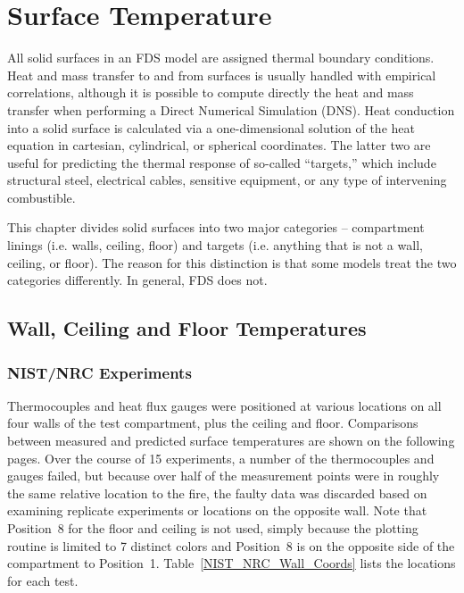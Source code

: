 
\chapter{Surface Temperature}

All solid surfaces in an FDS model are assigned thermal boundary conditions. Heat and mass transfer to and from surfaces is usually handled with empirical correlations, although it is possible to compute directly the heat and mass transfer when performing a Direct Numerical Simulation (DNS). Heat conduction into a solid surface is calculated via a one-dimensional solution of the heat equation in cartesian, cylindrical, or spherical coordinates. The latter two are useful for predicting the thermal response of so-called ``targets,'' which include structural steel, electrical cables, sensitive equipment, or any type of intervening combustible.

This chapter divides solid surfaces into two major categories -- compartment linings (i.e. walls, ceiling, floor) and targets (i.e. anything that is not a wall, ceiling, or floor). The reason for this distinction is that some models treat the two categories differently. In general, FDS does not.

\clearpage

\section{Wall, Ceiling and Floor Temperatures}


\subsection{NIST/NRC Experiments}

Thermocouples and heat flux gauges were positioned at various locations on all four walls of the test compartment, plus the ceiling and floor. Comparisons between measured and predicted surface temperatures are shown on the following pages. Over the course of 15 experiments, a number of the thermocouples and gauges failed, but because over half of the measurement points were in roughly the same relative location to the fire, the faulty data was discarded based on examining replicate experiments or locations on the opposite wall. Note that Position~8 for the floor and ceiling is not used, simply because the plotting routine is limited to 7 distinct colors and Position~8 is on the opposite side of the compartment to Position~1. Table~\ref{NIST_NRC_Wall_Coords} lists the locations for each test.

